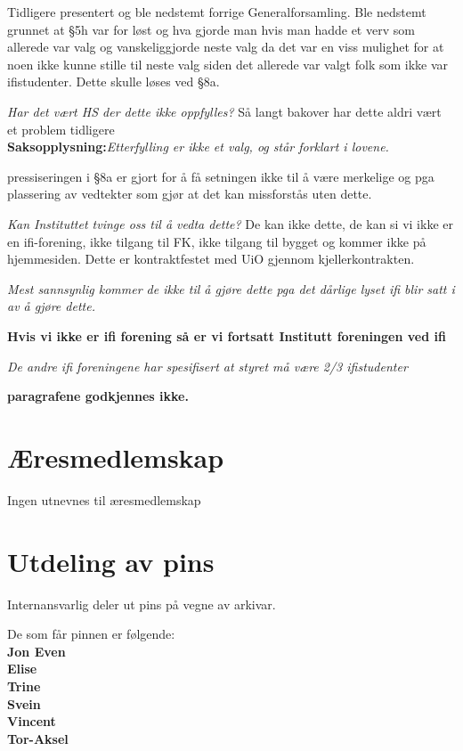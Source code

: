 \documentclass[10pt,norsk,a4paper]{article}
\begin{document}
Tidligere presentert og ble nedstemt forrige Generalforsamling.
Ble nedstemt grunnet at §5h var for løst og hva gjorde man hvis man hadde et
verv som allerede var valg og vanskeliggjorde neste valg da det var en viss
mulighet for at noen ikke kunne stille til neste valg siden det allerede var
valgt folk som ikke var ifistudenter. Dette skulle løses ved §8a.

\textit{Har det vært HS der dette ikke oppfylles?} Så langt bakover har dette aldri
vært et problem tidligere\\
\textbf{Saksopplysning:}\textit{Etterfylling er ikke et valg, og står forklart
i lovene.}

pressiseringen i §8a er gjort for å få setningen ikke til å være merkelige og pga
plassering av vedtekter som gjør at det kan missforstås uten dette.

\textit{Kan Instituttet tvinge oss til å vedta dette?}
De kan ikke dette, de kan si vi ikke er en ifi-forening, ikke tilgang til FK,
ikke tilgang til bygget og kommer ikke på hjemmesiden. Dette er kontraktfestet
med UiO gjennom kjellerkontrakten.

\textit{Mest sannsynlig kommer de ikke til å gjøre dette pga det dårlige lyset ifi blir satt
i av å gjøre dette.}

\textbf{Hvis vi ikke er ifi forening så er vi fortsatt Institutt foreningen
ved ifi}

\textit{De andre ifi foreningene har spesifisert at styret må være 2/3 ifistudenter}


\textbf{paragrafene godkjennes ikke.}

\section{Æresmedlemskap}
Ingen utnevnes til æresmedlemskap

\section{Utdeling av pins}\label{lastpage}
Internansvarlig deler ut pins på vegne av arkivar.

De som får pinnen er følgende:\\
\textbf{Jon Even}\\
\textbf{Elise}\\
\textbf{Trine}\\
\textbf{Svein}\\
\textbf{Vincent}\\
\textbf{Tor-Aksel}\\
\end{document}
